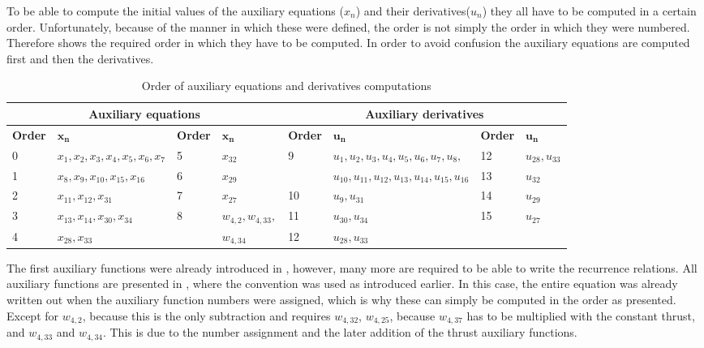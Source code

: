  
%

To be able to compute the initial values of the auxiliary equations ($x_{n}$) and their derivatives($u_{n}$) they all have to be computed in a certain order. Unfortunately, because of the manner in which these were defined, the order is not simply the order in which they were numbered. Therefore  shows the required order in which they have to be computed. In order to avoid confusion the auxiliary equations are computed first and then the derivatives.

\begin{table}[!ht]
\begin{center}
\caption{Order of auxiliary equations and derivatives computations}
\label{tab:calcOrderAuxEq}
\begin{tabular}{|l|l||l|l||l|l||l|l|}
\hline 
\multicolumn{4}{c}{\textbf{Auxiliary equations}} & \multicolumn{4}{c}{\textbf{Auxiliary derivatives}} \\ \hline \hline
\textbf{Order} & $\mathbf{x_{n}}$ &\textbf{Order} & $\mathbf{x_{n}}$ & \textbf{Order} & $\mathbf{u_{n}}$ & \textbf{Order} & $\mathbf{u_{n}}$ \\ \hline 
0 & $ x_{1}, x_{2}, x_{3}, x_{4}, x_{5}, x_{6}, x_{7} $ & 5 & $ x_{32} $ & 9 & $ u_{1}, u_{2}, u_{3}, u_{4}, u_{5}, u_{6}, u_{7}, u_{8},  $ &  12 & $ u_{28}, u_{33} $ \\ \cline{1-4} \cline{7-8}
1 & $ x_{8}, x_{9}, x_{10}, x_{15}, x_{16} $ &  6 & $ x_{29} $ &  & $ u_{10}, u_{11}, u_{12}, u_{13}, u_{14}, u_{15}, u_{16} $ &  13 & $ u_{32} $ \\ \hline
2 & $ x_{11}, x_{12}, x_{31} $ & 7 & $ x_{27} $ & 10 & $ u_{9}, u_{31} $ &  14 & $ u_{29} $ \\ \hline
3 & $ x_{13}, x_{14}, x_{30}, x_{34} $ &  8 & $ w_{4,2}, w_{4,33}, $ & 11 & $ u_{30}, u_{34} $ &  15 & $ u_{27} $ \\ \cline{1-2} \cline{5-8}
4 & $ x_{28}, x_{33} $ &  & $ w_{4,34} $ & 12 & $ u_{28}, u_{33} $ & & $  $ \\ \hline

\end{tabular}
\end{center}
\end{table}



The first auxiliary functions were already introduced in , however, many more are required to be able to write the recurrence relations. All auxiliary functions are presented in , where the convention was used as introduced earlier. In this case, the entire equation was already written out when the auxiliary function numbers were assigned, which is why these can simply be computed in the order as presented. Except for $w_{4,2}$, because this is the only subtraction and requires $w_{4,32}$, $w_{4,25}$, because $w_{4,37}$ has to be multiplied with the constant thrust, and $w_{4,33}$ and $w_{4,34}$. This is due to the number assignment and the later addition of the thrust auxiliary functions. 


